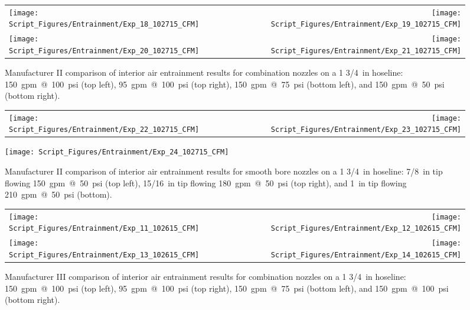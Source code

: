 \documentclass[12pt,oneside]{book}
\begin{document}
\begin{figure}[!ht]
\begin{tabular*}{\textwidth}{lr}
\texttt{[image: Script\_Figures/Entrainment/Exp\_18\_102715\_CFM]} &
\texttt{[image: Script\_Figures/Entrainment/Exp\_19\_102715\_CFM]} \\
\texttt{[image: Script\_Figures/Entrainment/Exp\_20\_102715\_CFM]} &
\texttt{[image: Script\_Figures/Entrainment/Exp\_21\_102715\_CFM]} \\
\end{tabular*}
\caption[Manufacturer II Air Entrainment from Combination Nozzle Varying Pressure and Flowrate]{Manufacturer II comparison of interior air entrainment results for combination nozzles on a 1 3/4~in hoseline: 150~gpm~@~100~psi (top left), 95~gpm~@~100~psi (top right), 150~gpm~@~75~psi (bottom left), and 150~gpm~@~50~psi (bottom right).}
\label{fig:1_5_Interior_Combination_Manufacturer_II}
\end{figure}

\clearpage

\begin{figure}[!ht]
\begin{tabular*}{\textwidth}{lr}
\texttt{[image: Script\_Figures/Entrainment/Exp\_22\_102715\_CFM]} &
\texttt{[image: Script\_Figures/Entrainment/Exp\_23\_102715\_CFM]} \\
\end{tabular*}
\centering
\texttt{[image: Script\_Figures/Entrainment/Exp\_24\_102715\_CFM]} 
\caption[Manufacturer II Air Entrainment from Smooth Bore Nozzle Varying Pressure and Flowrate]{Manufacturer II comparison of interior air entrainment results for smooth bore nozzles on a 1 3/4~in hoseline: 7/8~in tip flowing 150~gpm~@~50~psi (top left), 15/16~in tip flowing 180~gpm~@~50~psi (top right), and 1~in tip flowing 210~gpm~@~50~psi (bottom).}
\label{fig:1_5_Interior_Smooth_Bore_Manufacturer_II}
\end{figure}

\clearpage

\begin{figure}[!ht]
\begin{tabular*}{\textwidth}{lr}
\texttt{[image: Script\_Figures/Entrainment/Exp\_11\_102615\_CFM]} &
\texttt{[image: Script\_Figures/Entrainment/Exp\_12\_102615\_CFM]} \\
\texttt{[image: Script\_Figures/Entrainment/Exp\_13\_102615\_CFM]} &
\texttt{[image: Script\_Figures/Entrainment/Exp\_14\_102615\_CFM]} \\
\end{tabular*}
\caption[Manufacturer III Air Entrainment from Combination Nozzle Varying Pressure and Flowrate]{Manufacturer III comparison of interior air entrainment results for combination nozzles on a 1 3/4~in hoseline: 150~gpm~@~100~psi (top left), 95~gpm~@~100~psi (top right), 150~gpm~@~75~psi (bottom left), and 150~gpm~@~100~psi (bottom right).}
\label{fig:1_5_Interior_Combination_Manufacturer_III}
\end{figure}
\end{document}

